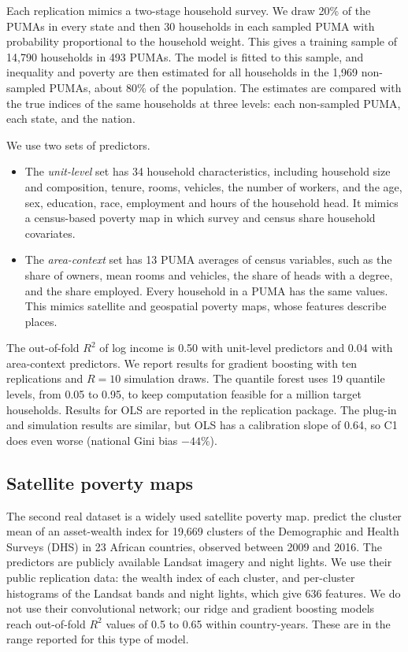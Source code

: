 \documentclass[pdflatex,sn-mathphys-ay]{sn-jnl}
\theoremstyle{thmstyleone}%
\theoremstyle{thmstyletwo}%
\theoremstyle{thmstylethree}%
\begin{document}
Each replication mimics a two-stage household survey. We draw 20\% of the PUMAs in every state and then 30 households in each sampled PUMA with probability proportional to the household weight. This gives a training sample of 14{,}790 households in 493 PUMAs. The model is fitted to this sample, and inequality and poverty are then estimated for all households in the 1{,}969 non-sampled PUMAs, about 80\% of the population. The estimates are compared with the true indices of the same households at three levels: each non-sampled PUMA, each state, and the nation.

We use two sets of predictors.
\begin{itemize}
\item The \emph{unit-level} set has 34 household characteristics, including household size and composition, tenure, rooms, vehicles, the number of workers, and the age, sex, education, race, employment and hours of the household head. It mimics a census-based poverty map in which survey and census share household covariates.
\item The \emph{area-context} set has 13 PUMA averages of census variables, such as the share of owners, mean rooms and vehicles, the share of heads with a degree, and the share employed. Every household in a PUMA has the same values. This mimics satellite and geospatial poverty maps, whose features describe places.
\end{itemize}

The out-of-fold $R^2$ of log income is 0.50 with unit-level predictors and 0.04 with area-context predictors. We report results for gradient boosting with ten replications and $R=10$ simulation draws. The quantile forest uses 19 quantile levels, from 0.05 to 0.95, to keep computation feasible for a million target households. Results for OLS are reported in the replication package. The plug-in and simulation results are similar, but OLS has a calibration slope of 0.64, so C1 does even worse (national Gini bias $-44\%$).

\subsection{Satellite poverty maps}\label{sec:data_sat}

The second real dataset is a widely used satellite poverty map. \citet{yeh2020} predict the cluster mean of an asset-wealth index for 19{,}669 clusters of the Demographic and Health Surveys (DHS) in 23 African countries, observed between 2009 and 2016. The predictors are publicly available Landsat imagery and night lights. We use their public replication data: the wealth index of each cluster, and per-cluster histograms of the Landsat bands and night lights, which give 636 features. We do not use their convolutional network; our ridge and gradient boosting models reach out-of-fold $R^2$ values of 0.5 to 0.65 within country-years. These are in the range reported for this type of model.
\end{document}
